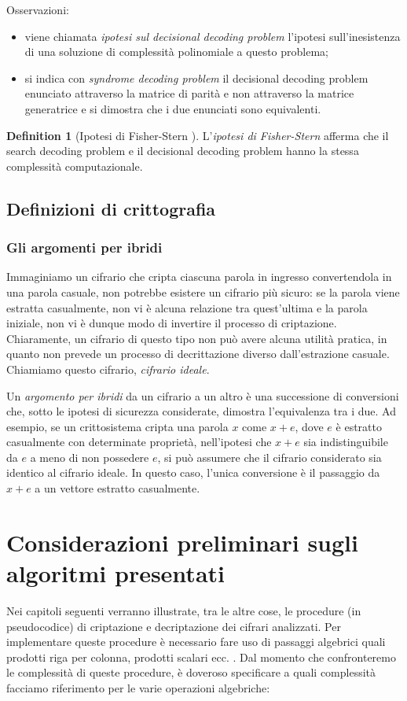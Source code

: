 \documentclass[12pt, a4paper]{report}
\theoremstyle{definition}
\newtheorem{definition}{Definition}[section]
\begin{document}
			Osservazioni:
			\begin{itemize}
				\item viene chiamata \emph{ipotesi sul decisional decoding problem} l’ipotesi sull’inesistenza di una soluzione di complessità polinomiale a questo problema;
				\item si indica con \emph{syndrome decoding problem} il decisional decoding problem enunciato attraverso la matrice di parità e non attraverso la matrice generatrice e si dimostra che i due enunciati sono equivalenti.
			\end{itemize}
			\begin{definition}[Ipotesi di Fisher-Stern \cite{7}] 
				L'\emph{ipotesi di Fisher-Stern} afferma che il search decoding problem e il decisional decoding problem hanno la stessa complessità computazionale.
			\end{definition}
		\section{Definizioni di crittografia}
			\subsection{Gli argomenti per ibridi \cite{19}}
				Immaginiamo un cifrario che cripta ciascuna parola in ingresso convertendola in una parola casuale, non potrebbe esistere un cifrario più sicuro: se la parola viene estratta casualmente, non vi è alcuna relazione tra quest'ultima e la parola iniziale, non vi è dunque modo di invertire il processo di criptazione. Chiaramente, un cifrario di questo tipo non può avere alcuna utilità pratica, in quanto non prevede un processo di decrittazione diverso dall'estrazione casuale. Chiamiamo questo cifrario, \emph{cifrario ideale}.
				
				Un \emph{argomento per ibridi} da un cifrario a un altro è una successione di conversioni che, sotto le ipotesi di sicurezza considerate, dimostra l'equivalenza tra i due. Ad esempio, se un crittosistema cripta una parola $x$ come $x+e$, dove $e$ è estratto casualmente con determinate proprietà, nell'ipotesi che $x+e$ sia indistinguibile da $e$ a meno di non possedere $e$, si può assumere che il cifrario considerato sia identico al cifrario ideale. In questo caso, l'unica conversione è il passaggio da $x+e$ a un vettore estratto casualmente.
	\chapter{Considerazioni preliminari sugli algoritmi presentati}
		Nei capitoli seguenti verranno illustrate, tra le altre cose, le procedure (in pseudocodice) di criptazione e decriptazione dei cifrari analizzati. Per implementare queste procedure è necessario fare uso di passaggi algebrici quali prodotti riga per colonna, prodotti scalari ecc. . Dal momento che confronteremo le complessità di queste procedure, è doveroso specificare a quali complessità facciamo riferimento per le varie operazioni algebriche: 
	
\end{document}
